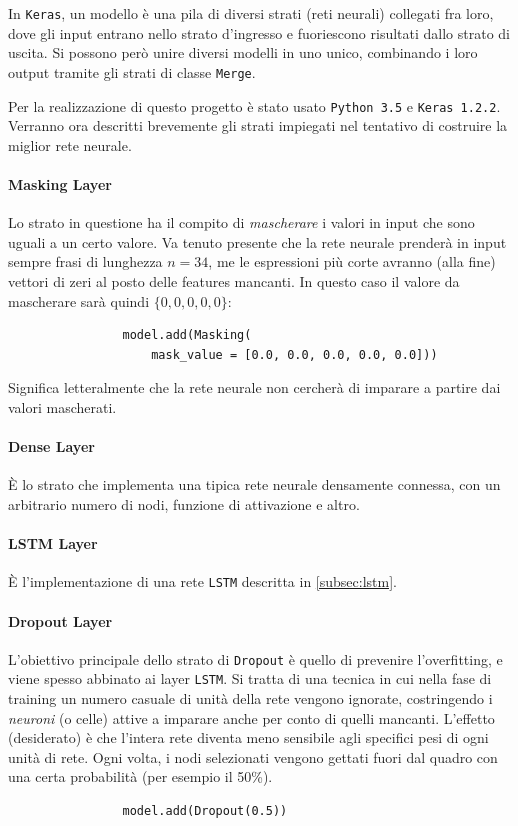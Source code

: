 \documentclass[twoside,twocolumn,10pt]{extarticle}
\theoremstyle{definition}
\begin{document}
	In \texttt{Keras}, un modello è una pila di diversi strati (reti neurali) collegati fra loro, dove gli input entrano nello strato d'ingresso e fuoriescono risultati dallo strato di uscita. Si possono però unire diversi modelli in uno unico, combinando i loro output tramite gli strati di classe \texttt{Merge}.
	
	Per la realizzazione di questo progetto è stato usato \texttt{Python 3.5} e \texttt{Keras 1.2.2}. Verranno ora descritti brevemente gli strati impiegati nel tentativo di costruire la miglior rete neurale.
	
	\paragraph{Masking Layer}
		Lo strato in questione ha il compito di \textit{mascherare} i valori in input che sono uguali a un certo valore. Va tenuto presente che la rete neurale prenderà in input sempre frasi di lunghezza $n = 34$, me le espressioni più corte avranno (alla fine) vettori di zeri al posto delle features mancanti. In questo caso il valore da mascherare sarà quindi $\{0, 0, 0, 0, 0\}$:
		\begin{center}
			\begin{verbatim}
				model.add(Masking(
					mask_value = [0.0, 0.0, 0.0, 0.0, 0.0]))
			\end{verbatim}
		\end{center}
		Significa letteralmente che la rete neurale non cercherà di imparare a partire dai valori mascherati.
	
	\paragraph{Dense Layer}
		È lo strato che implementa una tipica rete neurale densamente connessa, con un arbitrario numero di nodi, funzione di attivazione e altro.
		
	\paragraph{LSTM Layer}
		È l'implementazione di una rete \texttt{LSTM} descritta in \ref{subsec:lstm}.
		
	\paragraph{Dropout Layer}
		L'obiettivo principale dello strato di \texttt{Dropout} è quello di prevenire l'overfitting, e viene spesso abbinato ai layer \texttt{LSTM}. Si tratta di una tecnica in cui nella fase di training un numero casuale di unità della rete vengono ignorate, costringendo i \textit{neuroni} (o celle) attive a imparare anche per conto di quelli mancanti. L'effetto (desiderato) è che l'intera rete diventa meno sensibile agli specifici pesi di ogni unità di rete. Ogni volta, i nodi selezionati vengono gettati fuori dal quadro con una certa probabilità (per esempio il 50\%).
		\begin{center}
			\begin{verbatim}
				model.add(Dropout(0.5))
			\end{verbatim}
		\end{center}
	
\end{document}
